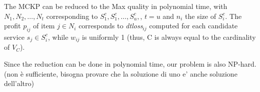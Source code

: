     The MCKP can be reduced to the Max quality \problem in polynomial time, with $N_1,N_2,\ldots,N_t$ corresponding to $S^c_{1}, S^c_{1}, \ldots, S^c_{u},$, $t$$=$$u$ and $n_i$ the size of $S^c_{i}$. The profit $p_{ij}$ of item $j$$\in$$N_i$ corresponds to \textit{dtloss}$_{ij}$ computed for each candidate service $s_j$$\in$$S^c_{i}$, while $w_{ij}$ is uniformly 1 (thus, C is always equal to the cardinality of $V_C$).

    Since the reduction can be done in polynomial time, our problem is also NP-hard. (non è sufficiente, bisogna provare che la soluzione di uno e' anche soluzione dell'altro)


    \begin{example}
    \end{example}


